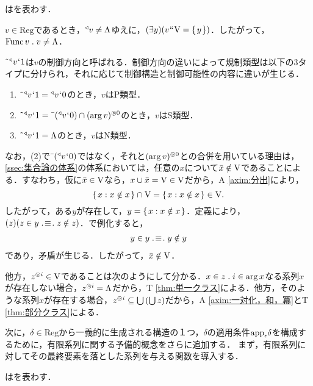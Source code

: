 \begin{df}
\label{df:規制類型}
はを表わす．
\end{df}
\noindent $v\in\mathrm{Reg}$であるとき，$ {^\triangleleft}v\neq\Lambda $ゆえに，$(\exists y)(v{\mspace{1mu}{``}\mspace{1mu}}\mathrm{V}=\{\mspace{2mu}y\mspace{2mu}\})$．したがって，$\func v\con{1}v\neq\Lambda$．

$ \tilde{\:\:}{^\triangleleft}v{\mspace{1mu}{`}\mspace{1mu}} 1 $は$v$の制御方向と呼ばれる．制御方向の違いによって規制類型は以下の3タイプに分けられ，それに応じて制御構造と制御可能性の内容に違いが生じる．
\begin{enumerate}[label=(\arabic*)]
    \item $ \tilde{\:\:}{^\triangleleft}v{\mspace{1mu}{`}\mspace{1mu}} 1 = {^\triangleleft}v{\mspace{1mu}{`}\mspace{1mu}} 0 $のとき，$v$はP類型．
    \item $ \tilde{\:\:}{^\triangleleft}v{\mspace{1mu}{`}\mspace{1mu}} 1 = \bar{\:\:}({^\triangleleft}v{\mspace{1mu}{`}\mspace{1mu}} 0)\cap(\arg v)^{\circledcirc 0} $のとき，$v$はS類型．
    \item $ \tilde{\:\:}{^\triangleleft}v{\mspace{1mu}{`}\mspace{1mu}} 1 = \Lambda $のとき，$v$はN類型．
\end{enumerate}
なお，(2)で$ \bar{\:\:}({^\triangleleft}v{\mspace{1mu}{`}\mspace{1mu}} 0) $ではなく，それと$(\arg v)^{\circledcirc 0}$との合併を用いている理由は，\ref{ssec:集合論の体系}の体系においては，任意の$x$について$\bar{x}\notin\mathrm{V}$であることによる．すなわち，仮に$ \bar{x}\in\mathrm{V} $なら，$ x\cup\bar{x} = \mathrm{V} \in\mathrm{V} $だから，A \ref{axim:分出}により，
\[
    \{\mspace{2mu}x:x\notin x\mspace{2mu}\}\cap\mathrm{V} = \{\mspace{2mu}x:x\notin x\mspace{2mu}\}\in\mathrm{V}.
\]
したがって，ある$y$が存在して，$ y = \{\mspace{2mu}x:x\notin x\mspace{2mu}\} $．定義により，$(z)(z\in y \case{3}{1}{1}z\notin z)$．で例化すると，
\begin{align*}
    y\in y \case{3}{1}{1}y\notin y
\end{align*}
であり，矛盾が生じる．したがって，$\bar{x}\notin\mathrm{V}$．

他方，$ z^{\circledcirc i}\in\mathrm{V} $であることは次のようにして分かる．$x\in z\con{1}i\in\arg x$なる系列$x$が存在しない場合，$z^{\circledcirc i}=\Lambda$だから，T \ref{thm:単一クラス}による．他方，そのような系列$x$が存在する場合，$ z^{\circledcirc i}\subseteq {\textstyle\bigcup}\mspace{3mu}({\textstyle\bigcup}\mspace{3mu}z) $だから，A \ref{axim:一対化，和，冪}とT \ref{thm:部分クラス}による．

次に，$\delta\in\mathrm{Reg}$から一義的に生成される構造の１つ，$\delta$の適用条件$ \mathrm{app}_{\epsilon}\delta $を構成するために，有限系列に関する予備的概念をさらに追加する．
まず，有限系列に対してその最終要素を落とした系列を与える関数を導入する．
\begin{df}
\label{df:系列の最終要素を除外}
はを表わす．
\end{df}

